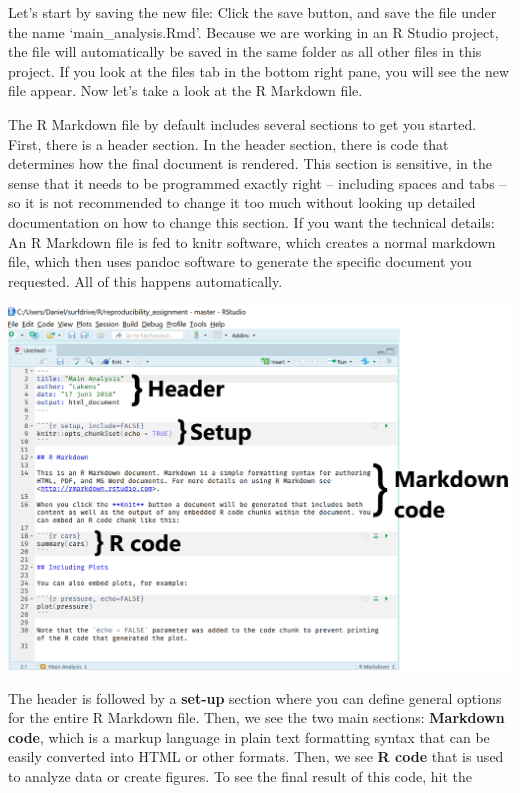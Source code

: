 \documentclass[
  oneside]{krantz}
\begin{document}
Let's start by saving the new file: Click the save button, and save the file
under the name `main\_analysis.Rmd'. Because we are working in an R Studio
project, the file will automatically be saved in the same folder as all other
files in this project. If you look at the files tab in the bottom right pane,
you will see the new file appear. Now let's take a look at the R Markdown file.

The R Markdown file by default includes several sections to get you started.
First, there is a header section. In the header section, there is code that
determines how the final document is rendered. This section is sensitive, in the
sense that it needs to be programmed exactly right -- including spaces and tabs --
so it is not recommended to change it too much without looking up detailed
documentation on how to change this section. If you want the technical details:
An R Markdown file is fed to knitr software, which creates a normal markdown
file, which then uses pandoc software to generate the specific document you
requested. All of this happens automatically.

\begin{center}\includegraphics[width=1\linewidth]{images/fd284f329222582a56ecb4906f99afee} \end{center}

The header is followed by a \textbf{set-up} section where you can define general
options for the entire R Markdown file. Then, we see the two main sections:
\textbf{Markdown code}, which is a markup language in plain text formatting syntax
that can be easily converted into HTML or other formats. Then, we see \textbf{R code}
that is used to analyze data or create figures. To see the final result of this
code, hit the
\end{document}
